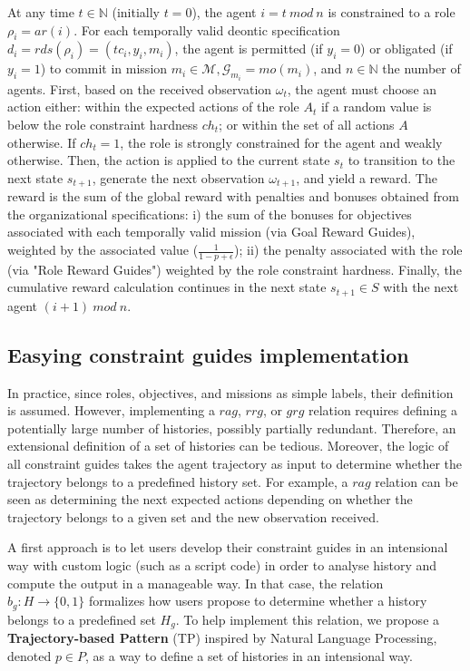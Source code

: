 \documentclass[sigconf,anonymous]{aamas}
\begin{document}
At any time $t \in \mathbb{N}$ (initially $t = 0$), the agent $i = t \ mod \ n$ is constrained to a role $\rho_i = ar(i)$. For each temporally valid deontic specification $d_i = rds(\rho_i) = (tc_i,y_i, m_i)$, the agent is permitted (if $y_i = 0$) or obligated (if $y_i = 1$) to commit in mission $m_i \in \mathcal{M}, \mathcal{G}_{m_i} = mo(m_i)$, and $n \in \mathbb{N}$ the number of agents.
%
First, based on the received observation $\omega_t$, the agent must choose an action either: within the expected actions of the role $A_t$ if a random value is below the role constraint hardness $ch_t$; or within the set of all actions $A$ otherwise. If $ch_t = 1$, the role is strongly constrained for the agent and weakly otherwise.
%
Then, the action is applied to the current state $s_t$ to transition to the next state $s_{t+1}$, generate the next observation $\omega_{t+1}$, and yield a reward. The reward is the sum of the global reward with penalties and bonuses obtained from the organizational specifications: \quad i) the sum of the bonuses for objectives associated with each temporally valid mission (via Goal Reward Guides), weighted by the associated value ($\frac{1}{1-p+\epsilon}$); \quad ii) the penalty associated with the role (via "Role Reward Guides") weighted by the role constraint hardness.
%
Finally, the cumulative reward calculation continues in the next state $s_{t+1} \in S$ with the next agent $(i+1) \ mod \ n$.

\subsection{Easying constraint guides implementation}

In practice, since roles, objectives, and missions as simple labels, their definition is assumed. However, implementing a $rag$, $rrg$, or $grg$ relation requires defining a potentially large number of histories, possibly partially redundant. Therefore, an extensional definition of a set of histories can be tedious. Moreover, the logic of all constraint guides takes the agent trajectory as input to determine whether the trajectory belongs to a predefined history set. For example, a $rag$ relation can be seen as determining the next expected actions depending on whether the trajectory belongs to a given set and the new observation received.

A first approach is to let users develop their constraint guides in an intensional way with custom logic (such as a script code) in order to analyse history and compute the output in a manageable way. In that case, the relation $b_g: H \to \{0,1\}$ formalizes how users propose to determine whether a history belongs to a predefined set $H_g$.
To help implement this relation, we propose a \textbf{Trajectory-based Pattern} (TP) inspired by Natural Language Processing, denoted $p \in P$, as a way to define a set of histories in an intensional way.
\end{document}
